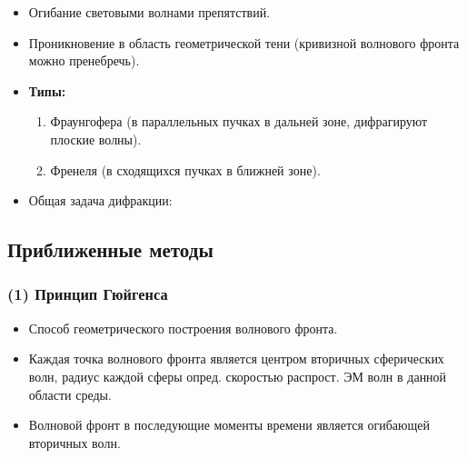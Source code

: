 \begin{itemize}
	\item Огибание световыми волнами препятствий.
	\item Проникновение в область геометрической тени (кривизной волнового фронта можно пренебречь).
	\item \textbf{Типы:}
	\begin{enumerate}
		\item Фраунгофера (в параллельных пучках в дальней зоне, дифрагируют плоские волны).
		\item Френеля (в сходящихся пучках в ближней зоне).
	\end{enumerate}
	\item Общая задача дифракции:
\end{itemize}

\begin{figure}[H]
	\centering
\end{figure}

\subsection{Приближенные методы}

\subsubsection{(1) Принцип Гюйгенса}
\begin{itemize}
	\item Способ геометрического построения волнового фронта.
	\item Каждая точка волнового фронта является центром вторичных сферических волн, радиус каждой сферы опред. скоростью распрост. ЭМ волн в данной области среды.
	\item Волновой фронт в последующие моменты времени является огибающей вторичных волн.
\end{itemize}

